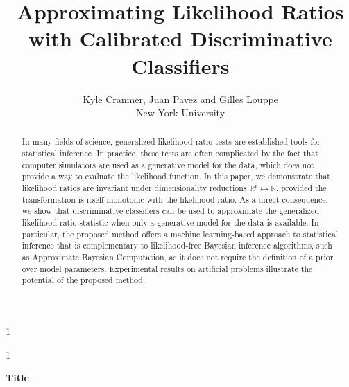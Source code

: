 \documentclass[12pt]{article}
\newcommand{\blind}{1}
\numberwithin{equation}{section}
\theoremstyle{plain}
\begin{document}
\def\spacingset#1{\renewcommand{\baselinestretch}%
{#1}\small\normalsize} \spacingset{1}



\blind
{
  \title{\bf Approximating Likelihood Ratios with Calibrated Discriminative Classifiers}
  \author{Kyle Cranmer, Juan Pavez and Gilles Louppe\\
          New York University}
  \maketitle
} \fi

\blind
{
  \bigskip
  \bigskip
  \bigskip
  \begin{center}
    {\LARGE\bf Title}
\end{center}
  \medskip
} \fi

\bigskip
\begin{abstract}


In many fields of science, generalized likelihood ratio tests are established tools for
statistical inference. In practice, these tests are often complicated by the fact
that computer simulators are used as a generative model for the data, which does
not provide a way to evaluate the likelihood function. In this paper, we
demonstrate that likelihood ratios are invariant under dimensionality reductions $\mathbb{R}^p \mapsto \mathbb{R}$,
provided the transformation is itself monotonic with the likelihood ratio. As a direct
consequence, we show that discriminative classifiers can be used to
approximate the generalized likelihood ratio statistic when only a generative model for the data is
available. In particular, the proposed method offers a machine learning-based
approach to statistical inference that is complementary to likelihood-free
Bayesian inference algorithms, such as Approximate Bayesian Computation, as it does
not require the definition of a prior over model parameters. Experimental results
on artificial problems illustrate the potential of the proposed method.

\end{abstract}
\end{document}
